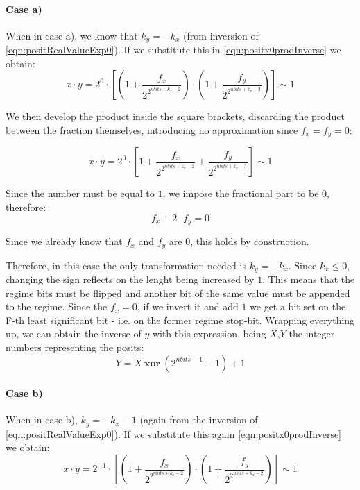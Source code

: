 \paragraph{Case a)} When in case a), we know that $k_y = -k_x$ (from inversion of \eqref{eqn:positRealValueExp0}). If we substitute this in \eqref{eqn:positx0prodInverse} we obtain:
\begin{equation}
    x \cdot y = 2^{0} \cdot \left[ \left (1 + \frac{f_x}{2^{2^{nbits + k_x - 2}}} \right ) \cdot \left (1 + \frac{f_y}{2^{2^{nbits + k_x - 3}}} \right ) \right] \sim 1
\end{equation}

We then develop the product inside the square brackets, discarding the product between the fraction themselves, introducing no approximation since $f_x = f_y = 0$:

\begin{equation}
    x \cdot y = 2^{0} \cdot \left[ 1 + \frac{f_x}{2^{2^{nbits + k_x - 2}}}  + \frac{f_y}{2^{2^{nbits + k_x - 3}}} \right] \sim 1
\end{equation}

Since the number must be equal to $1$, we impose the fractional part to be $0$, therefore:
\begin{equation}
    f_x + 2\cdot f_y = 0
\end{equation}

Since we already know that $f_x$ and $f_y$ are $0$, this holds by construction. 

Therefore, in this case the only transformation needed is $k_y = -k_x$. Since $k_x \leq 0$, changing the sign reflects on the lenght being increased by $1$. This means that the regime bits must be flipped and another bit of the same value must be appended to the regime. Since the $f_x = 0$, if we invert it and add $1$ we get a bit set on the F-th least significant bit - i.e. on the former regime stop-bit. Wrapping everything up, we can obtain the inverse of $y$ with this expression, being $X$,$Y$ the integer numbers representing the posits:
\begin{equation}
    Y = X\ \mathbf{xor}\ (2^{nbits - 1} - 1) + 1
\end{equation}

\paragraph{Case b)} When in case b), $k_y = -k_x - 1$ (again from the inversion of \eqref{eqn:positRealValueExp0}). If we substitute this again \eqref{eqn:positx0prodInverse} we obtain:
\begin{equation}
    x \cdot y = 2^{-1} \cdot \left[ \left (1 + \frac{f_x}{2^{2^{nbits + k_x - 2}}} \right ) \cdot \left (1 + \frac{f_y}{2^{2^{nbits + k_x - 2}}} \right ) \right] \sim 1
\end{equation}

